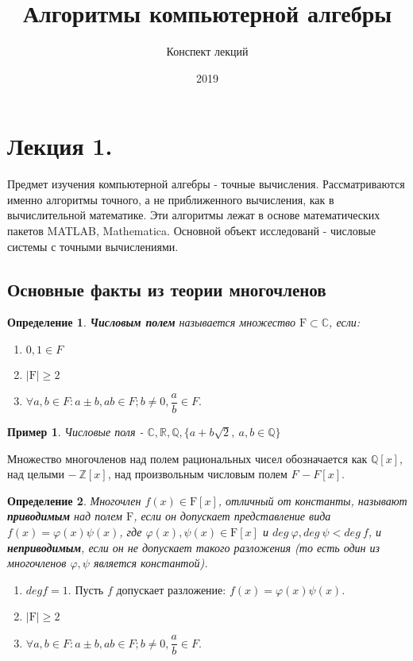 \documentclass[12pt]{article}
\begin{document}
\renewcommand{\contentsname}{Содержание}
\title{Алгоритмы компьютерной алгебры}
\author{Конспект лекций}
\date{2019}
\maketitle
\newpage

\tableofcontents
\newpage

\theoremstyle{plain}
\newtheorem{thm}{Теорема}
\newtheorem{defn}{Определение}
\newtheorem{examp}{Пример}
\newtheorem{lem}{Лемма}
\newtheorem{sled}{Следствие}
\newtheorem*{sl*}{Следствие}

\section{Лекция 1.}
Предмет изучения компьютерной алгебры - точные вычисления. Рассматриваются именно алгоритмы точного, а не приближенного вычисления, как в вычислительной математике. Эти алгоритмы лежат в основе математических пакетов MATLAB, Mathematica. Основной объект исследованй - числовые системы с точными вычислениями.

\subsection{Основные факты из теории многочленов}
\begin{defn}
\textbf{Числовым полем} называется множество $\mathrm{F} \subset \mathbb{C}$, если:
\begin{enumerate}
\item $0, 1 \in F$
\item $\mathrm{|F| \ge 2}$
\item $\forall a,b \in F: a \pm b, ab \in F; b \ne 0, \dfrac{a}{b} \in F.$
\end{enumerate}
\end{defn}

\begin{examp}
Числовые поля - $\mathbb{C}, \mathbb{R}, \mathbb{Q}, \{a + b\sqrt{2},~a,b \in \mathbb{Q}\}$
\end{examp}
Множество многочленов над полем рациональных чисел обозначается как $\mathbb{Q}[x]$, над целыми $-~\mathbb{Z}[x]$,
над произвольным числовым полем $F$ $-~F[x].$

\begin{defn}
Многочлен $f(x) \in \mathrm{F}[x]$, отличный от константы, называют \textbf{ приводимым} над полем $\mathrm{F}$, если он допускает представление вида $f(x) = \varphi(x) \psi(x)$, где $\varphi(x), \psi(x) \in \mathrm{F}[x]$ и $deg~\varphi,deg~\psi < deg~f$, и \textbf{ неприводимым}, если он не допускает такого разложения (то есть один из многочленов $\varphi, \psi$ является константой).
\end{defn}

\begin{enumerate}
\item $deg f = 1$.
Пусть $f$ допускает разложение: $f(x) = \varphi(x) \psi(x)$. 
\item $\mathrm{|F| \ge 2}$
\item $\forall a,b \in F: a \pm b, ab \in F; b \ne 0, \dfrac{a}{b} \in F.$
\end{enumerate}
\end{document}
